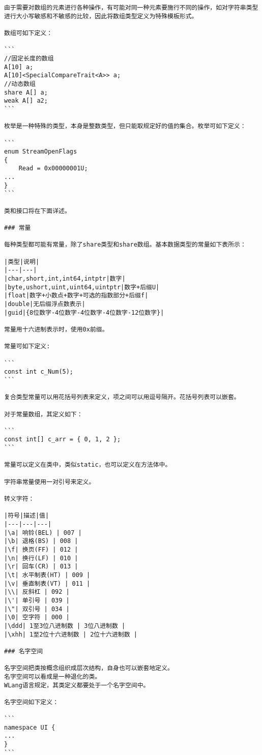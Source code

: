 \begin{lstlisting}
由于需要对数组的元素进行各种操作，有可能对同一种元素要施行不同的操作，如对字符串类型
进行大小写敏感和不敏感的比较，因此将数组类型定义为特殊模板形式。

数组可如下定义：

```
//固定长度的数组
A[10] a;
A[10]<SpecialCompareTrait<A>> a;
//动态数组
share A[] a;
weak A[] a2;
```

枚举是一种特殊的类型，本身是整数类型，但只能取规定好的值的集合。枚举可如下定义：

```
enum StreamOpenFlags
{
	Read = 0x00000001U;
...
}
```

类和接口将在下面详述。

### 常量

每种类型都可能有常量，除了share类型和share数组。基本数据类型的常量如下表所示：

|类型|说明|
|---|---|
|char,short,int,int64,intptr|数字|
|byte,ushort,uint,uint64,uintptr|数字+后缀U|
|float|数字+小数点+数字+可选的指数部分+后缀f|
|double|无后缀浮点数表示|
|guid|{8位数字-4位数字-4位数字-4位数字-12位数字}|

常量用十六进制表示时，使用0x前缀。

常量可如下定义:

```
const int c_Num(5);
```

复合类型常量可以用花括号列表来定义，项之间可以用逗号隔开。花括号列表可以嵌套。

对于常量数组，其定义如下：

```
const int[] c_arr = { 0, 1, 2 };
```

常量可以定义在类中，类似static，也可以定义在方法体中。

字符串常量使用一对引号来定义。

转义字符：

|符号|描述|值|
|---|---|---|
|\a| 响铃(BEL) | 007 |
|\b| 退格(BS) | 008 |
|\f| 换页(FF) | 012 |
|\n| 换行(LF) | 010 |
|\r| 回车(CR) | 013 |
|\t| 水平制表(HT) | 009 |
|\v| 垂直制表(VT) | 011 |
|\\| 反斜杠 | 092 |
|\'| 单引号 | 039 |
|\"| 双引号 | 034 |
|\0| 空字符 | 000 |
|\ddd| 1至3位八进制数 | 3位八进制数 |
|\xhh| 1至2位十六进制数 | 2位十六进制数 |

### 名字空间

名字空间把类按概念组织成层次结构，自身也可以嵌套地定义。
名字空间可以看成是一种退化的类。
WLang语言规定，其类定义都要处于一个名字空间中。

名字空间如下定义：

```
namespace UI {
...
}
```


\end{lstlisting}
